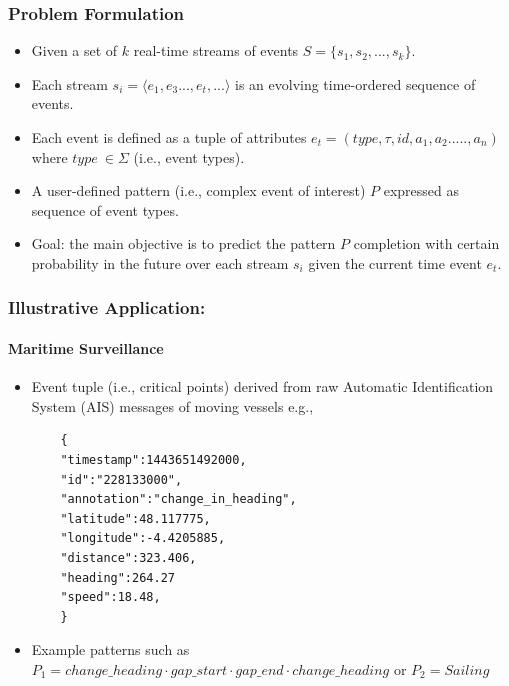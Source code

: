

\frame
{
	\frametitle{Problem Formulation}
	
	\begin{itemize}[]
		\item<1->Given a set of $k$ real-time streams of events $S = \{ s_1,s_2, ..., s_k\}$.
		
		\item<1 -> Each stream $s_i=\langle e_1,e_3...,e_t,...\rangle$  is an evolving time-ordered sequence of events.
		
		\item<1 -> Each event is defined as a tuple of attributes $e_t = (type,\tau,id,a_1,a_2.....,a_n)$ where $type\ \in  \Sigma$ (i.e., event types). 
		\item<1-> A user-defined pattern (i.e., complex event of interest) $P$ expressed as sequence of event types.
		
		
		\item<1->Goal: the main objective is to predict the pattern $P$ completion with certain probability in the future over each stream $s_i$ given the current time event $e_t$. 
	\end{itemize}
}

\begin{frame}[fragile]

	\frametitle{Illustrative Application:}
    \framesubtitle{Maritime Surveillance}
	\begin{itemize}
		\item<only@1> Event tuple (i.e., critical points) derived from raw Automatic Identification System (AIS) messages of moving vessels e.g., 
		\begin{verbatim}
	{
	"timestamp":1443651492000,
	"id":"228133000",
	"annotation":"change_in_heading",
	"latitude":48.117775,
	"longitude":-4.4205885,
	"distance":323.406,
	"heading":264.27
	"speed":18.48,
	}
	\end{verbatim}
	
		\item<only@1> Example patterns such as 
		$P_1=\mathit{change\_heading} \cdot \mathit{gap\_start} \cdot \mathit{gap\_end} \cdot 
		\mathit{change\_heading}$ or $P_2=\mathit{Sailing}$
	\end{itemize}
\end{frame}


